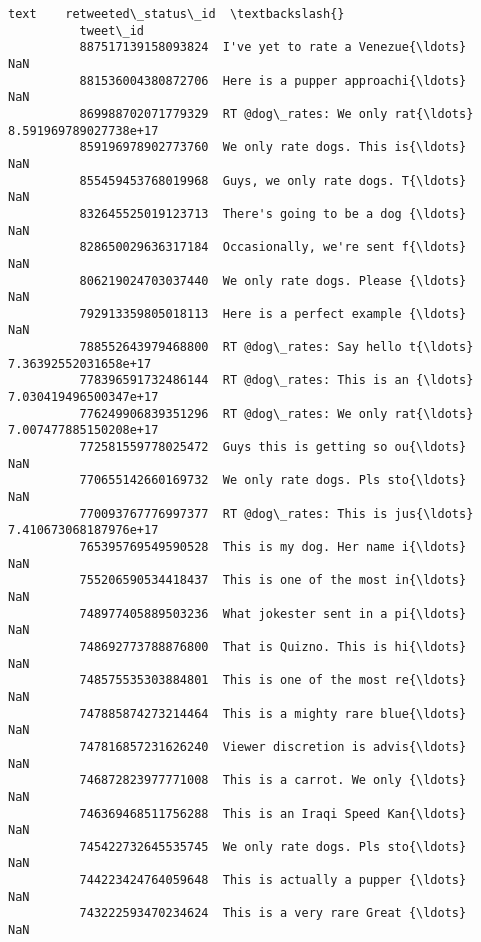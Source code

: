 \documentclass[11pt]{article}
\begin{document}
\begin{Verbatim}[commandchars=\\\{\}]
                                                       text    retweeted\_status\_id  \textbackslash{}
          tweet\_id                                                                   
          887517139158093824  I've yet to rate a Venezue{\ldots}                    NaN   
          881536004380872706  Here is a pupper approachi{\ldots}                    NaN   
          869988702071779329  RT @dog\_rates: We only rat{\ldots}  8.591969789027738e+17   
          859196978902773760  We only rate dogs. This is{\ldots}                    NaN   
          855459453768019968  Guys, we only rate dogs. T{\ldots}                    NaN   
          832645525019123713  There's going to be a dog {\ldots}                    NaN   
          828650029636317184  Occasionally, we're sent f{\ldots}                    NaN   
          806219024703037440  We only rate dogs. Please {\ldots}                    NaN   
          792913359805018113  Here is a perfect example {\ldots}                    NaN   
          788552643979468800  RT @dog\_rates: Say hello t{\ldots}   7.36392552031658e+17   
          778396591732486144  RT @dog\_rates: This is an {\ldots}  7.030419496500347e+17   
          776249906839351296  RT @dog\_rates: We only rat{\ldots}  7.007477885150208e+17   
          772581559778025472  Guys this is getting so ou{\ldots}                    NaN   
          770655142660169732  We only rate dogs. Pls sto{\ldots}                    NaN   
          770093767776997377  RT @dog\_rates: This is jus{\ldots}  7.410673068187976e+17   
          765395769549590528  This is my dog. Her name i{\ldots}                    NaN   
          755206590534418437  This is one of the most in{\ldots}                    NaN   
          748977405889503236  What jokester sent in a pi{\ldots}                    NaN   
          748692773788876800  That is Quizno. This is hi{\ldots}                    NaN   
          748575535303884801  This is one of the most re{\ldots}                    NaN   
          747885874273214464  This is a mighty rare blue{\ldots}                    NaN   
          747816857231626240  Viewer discretion is advis{\ldots}                    NaN   
          746872823977771008  This is a carrot. We only {\ldots}                    NaN   
          746369468511756288  This is an Iraqi Speed Kan{\ldots}                    NaN   
          745422732645535745  We only rate dogs. Pls sto{\ldots}                    NaN   
          744223424764059648  This is actually a pupper {\ldots}                    NaN   
          743222593470234624  This is a very rare Great {\ldots}                    NaN   

\end{Verbatim}
\end{document}
